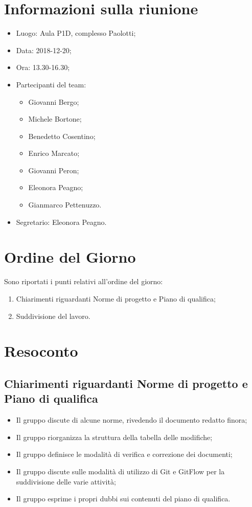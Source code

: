 \documentclass[11pt,a4paper]{article}
\begin{document}
	\section{Informazioni sulla riunione}
	\begin{itemize}
		\item Luogo: Aula P1D, complesso Paolotti;
		\item Data: 2018-12-20;
		\item Ora: 13.30-16.30;
		\item Partecipanti del team:
			\begin{itemize}
				\item Giovanni Bergo;
				\item Michele Bortone;
				\item Benedetto Cosentino;
				\item Enrico Marcato;
				\item Giovanni Peron;
				\item Eleonora Peagno;
				\item Gianmarco Pettenuzzo.
			\end{itemize}
		\item Segretario: Eleonora Peagno.
	\end{itemize}
	
	\section{Ordine del Giorno}
	Sono riportati i punti relativi all'ordine del giorno:
	\begin{enumerate}
		\item Chiarimenti riguardanti Norme di progetto e Piano di qualifica;
		\item Suddivisione del lavoro.
	\end{enumerate}
	
	\section{Resoconto}
	\subsection{Chiarimenti riguardanti Norme di progetto e Piano di qualifica}
	\begin{itemize}
		\item Il gruppo discute di alcune norme, rivedendo il documento redatto finora;
		\item Il gruppo riorganizza la struttura della tabella delle modifiche;
		\item Il gruppo definisce le modalità di verifica e correzione dei documenti;
		\item Il gruppo discute sulle modalità di utilizzo di Git e GitFlow per la suddivisione delle varie attività;
		\item Il gruppo esprime i propri dubbi sui contenuti del piano di qualifica.
	\end{itemize}
\end{document}
